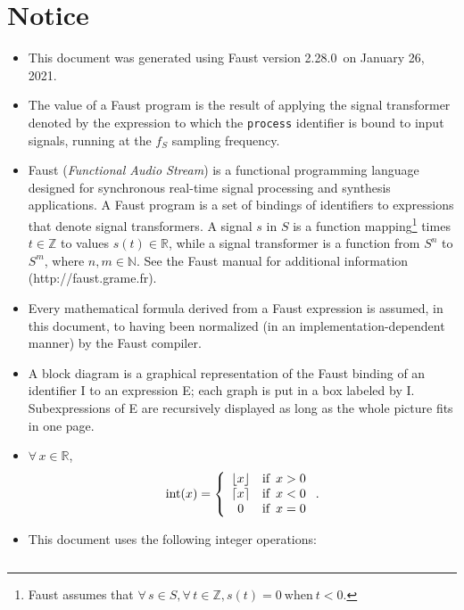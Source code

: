 \documentclass{article}
\newcommand{\faustversion}{2.28.0}
\newcommand{\faustdocdate}{January 26, 2021}
\begin{document}
 \section{Notice} \label{notice}  
\begin{itemize}
	\item This document was generated using Faust version \faustversion\ on \faustdocdate.
	\item The value of a Faust program is the result of applying the signal transformer denoted by the expression to which the \texttt{process} identifier is bound to input signals, running at the $f_S$ sampling frequency.
	\item Faust (\emph{Functional Audio Stream}) is a functional programming language designed for synchronous real-time signal processing and synthesis applications. A Faust program is a set of bindings of identifiers to expressions that denote signal transformers. A signal $s$ in $S$ is a function mapping\footnote{Faust assumes that $\forall \, s \in S, \forall \, t \in \mathbb{Z}, s(t) = 0 \mathrm{\ when\ } t < 0$.} times $t \in \mathbb{Z}$ to values $s(t) \in \mathbb{R}$, while a signal transformer is a function from $S^n$ to $S^m$, where $n,m\in \mathbb{N}$. See the Faust manual for additional information (\textsf{http://faust.grame.fr}).
	\item Every mathematical formula derived from a Faust expression is assumed, in this document, to having been normalized (in an implementation-depen\-dent manner) by the Faust compiler.
	\item A block diagram is a graphical representation of the Faust binding of an identifier I to an expression E; each graph is put in a box labeled by I. Subexpressions of E are recursively displayed as long as the whole picture fits in one page.
	\item $\forall \, x \in \mathbb{R}$, 
	\begin{displaymath}
		\mathrm{int}(x) =
		\left\{\begin{array}{cl}
			\lfloor x \rfloor & \mbox{if \,} x > 0 \\
			\lceil x \rceil & \mbox{if \,} x < 0 \\
			0 & \mbox{if \,} x = 0 \\
		\end{array}\right..
	\end{displaymath}
	\item 
		This document uses the following integer operations:
	\begin{center}
	\begin{tabular}{|c|l|l|} 

\end{tabular}
\end{center}
\end{itemize}
\end{document}
